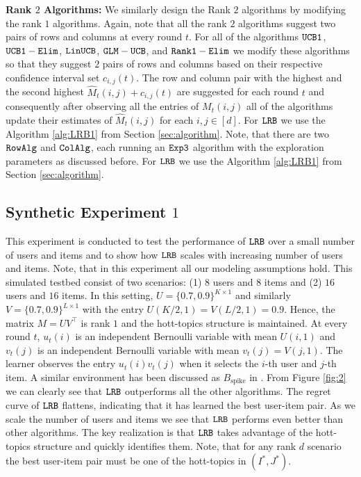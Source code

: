 \textbf{Rank $2$ Algorithms:} We similarly design the Rank $2$ algorithms by modifying the rank $1$ algorithms. Again, note that all the rank $2$ algorithms suggest two pairs of rows and columns at every round $t$. For all of the algorithms ${\tt UCB1}$, ${\tt UCB1-Elim}$, ${\tt LinUCB}$, $\tt GLM-UCB$, and $\tt Rank1-Elim$ we modify these algorithms so that they suggest $2$ pairs of rows and columns based on their respective confidence interval set $c_{i, j}(t)$. The row and column pair with the highest and the second highest $\hat{M}_{t}(i,j) + c_{i, j}(t)$ are suggested for each round $t$ and consequently after observing all the entries of $M_t(i,j)$ all of the algorithms update their estimates of $\hat{M}_{t}(i,j)$ for each $i,j \in [d]$. For ${\tt LRB}$ we use the Algorithm \ref{alg:LRB1} from Section \ref{sec:algorithm}. Note, that there are two ${\tt RowAlg}$ and ${\tt ColAlg}$, each running an ${\tt Exp3}$ algorithm with the  exploration parameters as discussed before. For ${\tt LRB}$ we use the Algorithm \ref{alg:LRB1} from Section \ref{sec:algorithm}. 

\subsection{Synthetic Experiment $1$}
This experiment is conducted to test the performance of ${\tt LRB}$ over a small number of users and items and to show how ${\tt LRB}$ scales with increasing number of users and items. Note, that in this experiment all our modeling assumptions hold. This simulated testbed consist of two scenarios: (1) $8$ users and $8$ items and (2) $16$ users and $16$ items. In this setting, $U = \{0.7, 0.9\}^{K\times 1}$ and similarly $V = \{0.7, 0.9\}^{L\times 1}$ with the entry $U(K/2,1) = V(L/2,1) = 0.9$. Hence, the matrix $M = UV^{\intercal}$ is rank $1$ and the hott-topics structure is maintained. At every round $t$, $u_t(i)$ is an independent Bernoulli variable with mean $U(i,1)$ and $v_t(j)$ is an independent Bernoulli variable with mean $v_t(j) = V(j,1)$. The learner observes the entry $u_t(i)v_t(j)$ when it selects the $i$-th user and $j$-th item. A similar environment has been discussed as $B_{\text{spike}}$ in \citep{katariya2016stochastic}. From Figure \ref{fig:2} we can clearly see that ${\tt LRB}$ outperforms all the other algorithms. The regret curve of ${\tt LRB}$ flattens, indicating that it has learned the best user-item pair. As we scale the number of users and items we see that ${\tt LRB}$ performs even better than other algorithms. The key realization is that ${\tt LRB}$ takes advantage of the hott-topics structure and quickly identifies them. Note, that for any rank $d$ scenario the best user-item pair must be one of the hott-topics in $(I^*, J^*)$.

